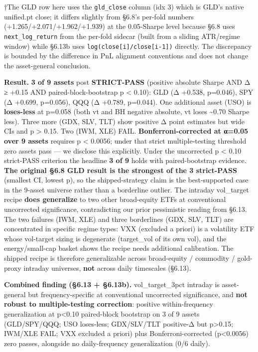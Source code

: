 \documentclass[
]{article}
\begin{document}
†The GLD row here uses the \texttt{gld\_close} column (idx 3) which is
GLD's native unified.pt close; it differs slightly from §6.8's per-fold
numbers (+1.265/+2.071/+1.962/+1.939) at the 0.05-Sharpe level because
§6.8 uses \texttt{next\_log\_return} from the per-fold sidecar (built
from a sliding ATR/regime window) while §6.13b uses
\texttt{log(close{[}i{]}/close{[}i-1{]})} directly. The discrepancy is
bounded by the difference in PnL alignment conventions and does not
change the asset-general conclusion.

\textbf{Result.} \textbf{3 of 9 assets} post \textbf{STRICT-PASS}
(positive absolute Sharpe AND Δ ≥ +0.15 AND paired-block-bootstrap p
\textless{} 0.10): GLD (Δ +0.538, p=0.046), SPY (Δ +0.699, p=0.056), QQQ
(Δ +0.789, p=0.044). One additional asset (USO) is \textbf{loses-less}
at p=0.058 (both vt and BH negative absolute, vt loses
\textasciitilde0.70 Sharpe less). Three more (GDX, SLV, TLT) show
positive Δ point estimates but wide CIs and p \textgreater{} 0.15. Two
(IWM, XLE) FAIL. \textbf{Bonferroni-corrected at α=0.05 over 9 assets}
requires p \textless{} 0.0056; under that strict multiple-testing
threshold zero assets pass --- we disclose this explicitly. Under the
uncorrected p \textless{} 0.10 strict-PASS criterion the headline
\textbf{3 of 9} holds with paired-bootstrap evidence. \textbf{The
original §6.8 GLD result is the strongest of the 3 strict-PASS}
(smallest CI, lowest p), so the shipped-strategy claim is the
best-supported case in the 9-asset universe rather than a borderline
outlier. The intraday vol\_target recipe \textbf{does generalize} to two
other broad-equity ETFs at conventional uncorrected significance,
contradicting our prior pessimistic reading from §6.13. The two failures
(IWM, XLE) and three borderlines (GDX, SLV, TLT) are concentrated in
specific regime types: VXX (excluded a priori) is a volatility ETF whose
vol-target sizing is degenerate (target\_vol of its own vol), and the
energy/small-cap basket shows the recipe needs additional calibration.
The shipped recipe is therefore generalizable across broad-equity /
commodity / gold-proxy intraday universes, \textbf{not} across daily
timescales (§6.13).

\textbf{Combined finding (§6.13 + §6.13b).} vol\_target\_3pct intraday
is asset-general but frequency-specific at conventional uncorrected
significance, and \textbf{not robust to multiple-testing correction}:
positive within-frequency generalization at p\textless0.10 paired-block
bootstrap on 3 of 9 assets (GLD/SPY/QQQ; USO loses-less; GDX/SLV/TLT
positive-Δ but p\textgreater0.15; IWM/XLE FAIL; VXX excluded a priori)
plus Bonferroni-corrected (p\textless0.0056) zero passes, alongside no
daily-frequency generalization (0/6 daily).
\end{document}

